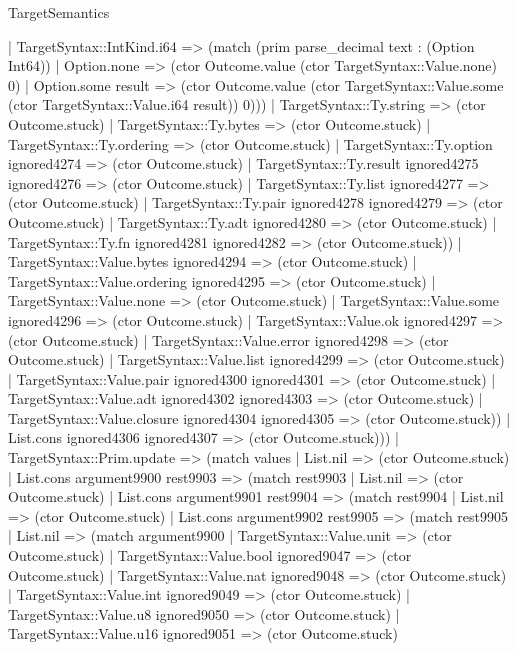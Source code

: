 \begin{lexlean}{TargetSemantics}
\begin{semanticmodule}
{              | TargetSyntax::IntKind.i64 => (match (prim parse_decimal text : (Option Int64))
                | Option.none => (ctor Outcome.value (ctor TargetSyntax::Value.none) 0)
                | Option.some result => (ctor Outcome.value (ctor TargetSyntax::Value.some (ctor TargetSyntax::Value.i64 result)) 0)))
            | TargetSyntax::Ty.string => (ctor Outcome.stuck)
            | TargetSyntax::Ty.bytes => (ctor Outcome.stuck)
            | TargetSyntax::Ty.ordering => (ctor Outcome.stuck)
            | TargetSyntax::Ty.option ignored4274 => (ctor Outcome.stuck)
            | TargetSyntax::Ty.result ignored4275 ignored4276 => (ctor Outcome.stuck)
            | TargetSyntax::Ty.list ignored4277 => (ctor Outcome.stuck)
            | TargetSyntax::Ty.pair ignored4278 ignored4279 => (ctor Outcome.stuck)
            | TargetSyntax::Ty.adt ignored4280 => (ctor Outcome.stuck)
            | TargetSyntax::Ty.fn ignored4281 ignored4282 => (ctor Outcome.stuck))
          | TargetSyntax::Value.bytes ignored4294 => (ctor Outcome.stuck)
          | TargetSyntax::Value.ordering ignored4295 => (ctor Outcome.stuck)
          | TargetSyntax::Value.none => (ctor Outcome.stuck)
          | TargetSyntax::Value.some ignored4296 => (ctor Outcome.stuck)
          | TargetSyntax::Value.ok ignored4297 => (ctor Outcome.stuck)
          | TargetSyntax::Value.error ignored4298 => (ctor Outcome.stuck)
          | TargetSyntax::Value.list ignored4299 => (ctor Outcome.stuck)
          | TargetSyntax::Value.pair ignored4300 ignored4301 => (ctor Outcome.stuck)
          | TargetSyntax::Value.adt ignored4302 ignored4303 => (ctor Outcome.stuck)
          | TargetSyntax::Value.closure ignored4304 ignored4305 => (ctor Outcome.stuck))
        | List.cons ignored4306 ignored4307 => (ctor Outcome.stuck)))
    | TargetSyntax::Prim.update => (match values
      | List.nil => (ctor Outcome.stuck)
      | List.cons argument9900 rest9903 => (match rest9903
        | List.nil => (ctor Outcome.stuck)
        | List.cons argument9901 rest9904 => (match rest9904
          | List.nil => (ctor Outcome.stuck)
          | List.cons argument9902 rest9905 => (match rest9905
            | List.nil => (match argument9900
              | TargetSyntax::Value.unit => (ctor Outcome.stuck)
              | TargetSyntax::Value.bool ignored9047 => (ctor Outcome.stuck)
              | TargetSyntax::Value.nat ignored9048 => (ctor Outcome.stuck)
              | TargetSyntax::Value.int ignored9049 => (ctor Outcome.stuck)
              | TargetSyntax::Value.u8 ignored9050 => (ctor Outcome.stuck)
              | TargetSyntax::Value.u16 ignored9051 => (ctor Outcome.stuck)
}
\end{semanticmodule}
\end{lexlean}

